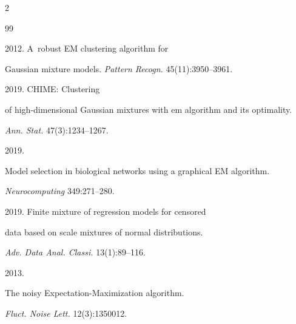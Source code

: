   \begin{multicols}{2}



\renewcommand{\bibname}{\protect\rmfamily References}




{\small\frenchspacing

 {%


 \begin{thebibliography}{99}


 2012. A~robust EM clustering algorithm for 

Gaussian mixture models. \textit{Pattern Recogn.} 45(11):3950--3961.




 2019. CHIME: Clustering 

of high-dimensional Gaussian mixtures with em algorithm and its optimality. 

\textit{Ann. Stat.} 47(3):1234--1267.




 2019. 

Model selection in biological networks using a graphical EM algorithm. 

 \textit{Neurocomputing} 349:271--280.





 2019. Finite mixture of regression models for censored 

 data based on scale mixtures of normal distributions. 

  \textit{Adv. Data Anal. Classi.} 13(1):89--116.




 2013. 

The noisy Expectation-Maximization algorithm. 

 \textit{Fluct. Noise Lett.} 12(3):1350012.




\end{thebibliography}}}
\end{multicols}
